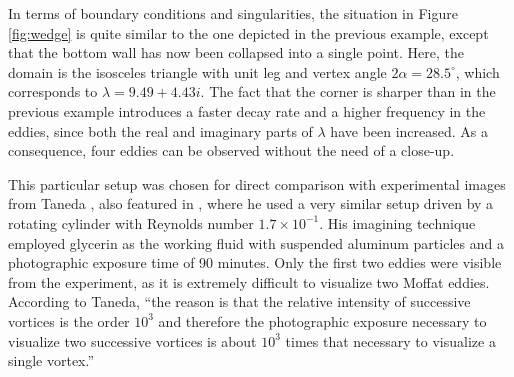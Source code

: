 \begin{example}
\label{ex:triangle}
In terms of boundary conditions and singularities, the situation in Figure \ref{fig:wedge} is quite similar to the one depicted in the previous example, except that the bottom wall has now been collapsed into a single point. Here, the domain is the isosceles triangle with unit leg and vertex angle $2\alpha = 28.5^\circ$, which corresponds to $\lambda = 9.49 + 4.43i$. The fact that the corner is sharper than in the previous example introduces a faster decay rate and a higher frequency in the eddies, since both the real and imaginary parts of $\lambda$ have been increased. As a consequence, four eddies can be observed without the need of a close-up.

This particular setup was chosen for direct comparison with experimental images from Taneda \cite[Fig.~19]{taneda79}, also featured in \cite[Fig.~10]{vandyke82}, where he used a very similar setup driven by a rotating cylinder with Reynolds number $1.7\times10^{-1}$. His imagining technique employed glycerin as the working fluid with suspended aluminum particles and a photographic exposure time of 90 minutes. Only the first two eddies were visible from the experiment, as it is extremely difficult to visualize two Moffat eddies. According to Taneda, ``the reason is that the relative intensity of successive vortices is the order $10^3$ and therefore the photographic exposure necessary to visualize two successive vortices is about $10^3$ times that necessary to visualize a single vortex.''


\end{example}
